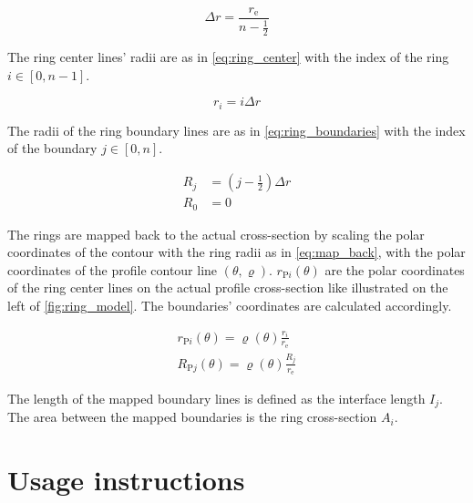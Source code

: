 \documentclass[11pt]{PyRollDocs}
\begin{document}
    \begin{equation}
        \Delta r = \frac{r_{\mathrm{e}}}{n - \frac{1}{2}}
        \label{eq:delta_r}
    \end{equation}

    The ring center lines' radii are as in \autoref{eq:ring_center} with the index of the ring $i \in [0, n-1]$.

    \begin{equation}
        r_i = i \Delta r
        \label{eq:ring_center}
    \end{equation}

    The radii of the ring boundary lines are as in \autoref{eq:ring_boundaries} with the index of the boundary $j \in [0, n]$.

    \begin{subequations}
        \begin{align}
            R_j &= \left(j - \frac{1}{2}\right) \Delta r\\
            R_0 &= 0
        \end{align}
        \label{eq:ring_boundaries}
    \end{subequations}

    The rings are mapped back to the actual cross-section by scaling the polar coordinates of the contour with the ring radii as in \autoref{eq:map_back}, with the polar coordinates of the profile contour line $(\theta, \varrho)$. $r_{\mathrm{P}i}(\theta)$ are the polar coordinates of the ring center lines on the actual profile cross-section like illustrated on the left of \autoref{fig:ring_model}.
    The boundaries' coordinates are calculated accordingly.

    \begin{subequations}
        \begin{gather}
            r_{\mathrm{P}i}(\theta) = \varrho(\theta) \frac{r_i}{r_{\mathrm{e}}}\\
            R_{\mathrm{P}j}(\theta) = \varrho(\theta) \frac{R_j}{r_{\mathrm{e}}}
        \end{gather}
        \label{eq:map_back}
    \end{subequations}

    The length of the mapped boundary lines is defined as the interface length $I_j$.
    The area between the mapped boundaries is the ring cross-section $A_i$.


    \section{Usage instructions}\label{sec:usage-instructions}
\end{document}
